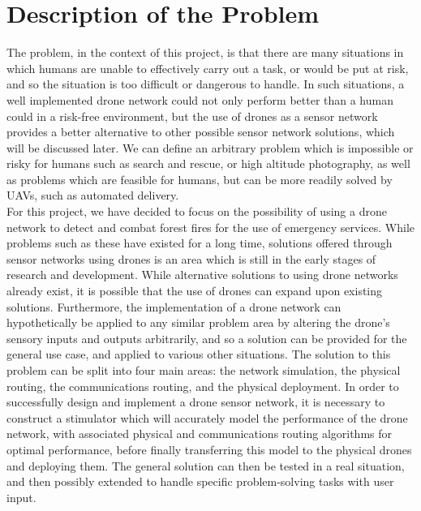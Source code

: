 \documentclass[12pt,a4paper,twoside]{report}
\begin{document}
	\section{Description of the Problem}
	The problem, in the context of this project, is that there are many situations in which humans are unable to effectively carry out a task, or would be put at risk, and so the situation is too difficult or dangerous to handle. In such situations, a well implemented drone network could not only perform better than a human could in a risk-free environment, but the use of drones as a sensor network provides a better alternative to other possible sensor network solutions, which will be discussed later. We can define an arbitrary problem which is impossible or risky for humans such as search and rescue, or high altitude photography, as well as problems which are feasible for humans, but can be more readily solved by UAVs, such as automated delivery. \\
	For this project, we have decided to focus on the possibility of using a drone network to detect and combat forest fires for the use of emergency services. While problems such as these have existed for a long time, solutions offered through sensor networks using drones is an area which is still in the early stages of research and development. While alternative solutions to using drone networks already exist, it is possible that the use of drones can expand upon existing solutions. Furthermore, the implementation of a drone network can hypothetically be applied to any similar problem area by altering the drone’s sensory inputs and outputs arbitrarily, and so a solution can be provided for the general use case, and applied to various other situations.
The solution to this problem can be split into four main areas: the network simulation, the physical routing, the communications routing, and the physical deployment. In order to successfully design and implement a drone sensor network, it is necessary to construct a stimulator which will accurately model the performance of the drone network, with associated physical and communications routing algorithms for optimal performance, before finally transferring this model to the physical drones and deploying them. The general solution can then be tested in a real situation, and then possibly extended to handle specific problem-solving tasks with user input. 
\end{document}
